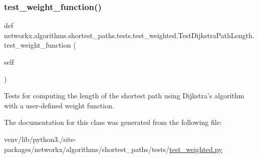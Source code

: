 \subsubsection{\texorpdfstring{test\+\_\+weight\+\_\+function()}{test\_weight\_function()}}
{\footnotesize\ttfamily def networkx.\+algorithms.\+shortest\+\_\+paths.\+tests.\+test\+\_\+weighted.\+Test\+Dijkstra\+Path\+Length.\+test\+\_\+weight\+\_\+function (\begin{DoxyParamCaption}\item[{}]{self }\end{DoxyParamCaption})}

\begin{DoxyVerb}Tests for computing the length of the shortest path using
Dijkstra's algorithm with a user-defined weight function.\end{DoxyVerb}
 

The documentation for this class was generated from the following file\+:\begin{DoxyCompactItemize}
\item 
venv/lib/python3./site-\/packages/networkx/algorithms/shortest\+\_\+paths/tests/\hyperlink{test__weighted_8py}{test\+\_\+weighted.\+py}\end{DoxyCompactItemize}
